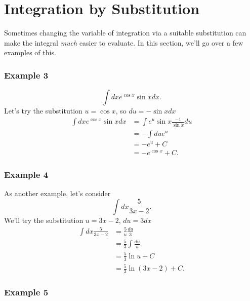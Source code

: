 \documentclass{article}
\begin{document}
\section{Integration by Substitution}

Sometimes changing the variable of integration via a suitable substitution can make the integral \emph{much} easier to evaluate.
In this section, we'll go over a few examples of this.

\subsubsection*{Example 3}

\begin{equation}
	\int dx e^{\cos x} \sin x dx.
\end{equation}
Let's try the substitution $u = \cos x$, so $du = -\sin x dx$
\begin{align*}
	\int dx e^{\cos x} \sin x dx &= \int e^u \sin x \frac{-1}{\sin x} du \\
	&= -\int du e^u \\
	&= -e^u + C \\
	&= -e^{\cos x} + C.
\end{align*}

\subsubsection*{Example 4}

As another example, let's consider
\begin{equation}
	\int dx \frac{5}{3x - 2}.
\end{equation}
We'll try the substitution $u = 3x -2$, $du = 3 dx$
\begin{align*}
	\int dx \frac{5}{3x - 2} &= \frac{5}{u} \frac{du}{3} \\
	&= \frac{5}{3} \int \frac{du}{u} \\
	&= \frac{5}{3} \ln u + C \\
	&= \frac{5}{3} \ln (3x - 2) + C.
\end{align*}

\subsubsection*{Example 5}
\end{document}
